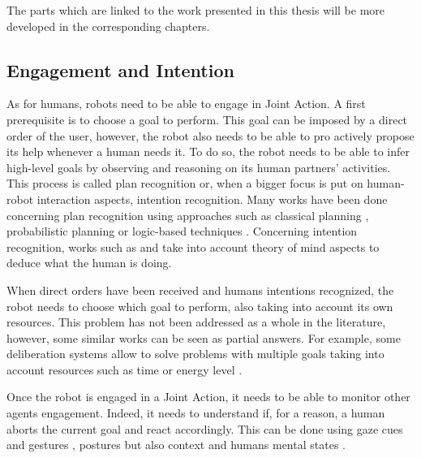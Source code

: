 \documentclass[english,a4paper,11pt,twoside]{StyleThese}
\begin{document}
The parts which are linked to the work presented in this thesis will be more developed in the corresponding chapters.

\subsection{Engagement and Intention}

\label{subsec:engagement}

As for humans, robots need to be able to engage in Joint Action. A first prerequisite is to choose a goal to perform. This goal can be imposed by a direct order of the user, however, the robot also needs to be able to pro actively propose its help whenever a human needs it. To do so, the robot needs to be able to infer high-level goals by observing and reasoning on its human partners’ activities. This process is called plan recognition or, when a bigger focus is put on human-robot interaction aspects, intention recognition. Many works have been done concerning plan recognition using approaches such as classical planning \cite{ramirez2009plan}, probabilistic planning \cite{bui2003general} or logic-based techniques \cite{singla2011abductive}. Concerning intention recognition, works such as \cite{breazeal2009embodied} and \cite{baker2014modeling} take into account theory of mind aspects to deduce what the human is doing.

When direct orders have been received and humans intentions recognized, the robot needs to choose which goal to perform, also taking into account its own resources. This problem has not been addressed as a whole in the literature, however, some similar works can be seen as partial answers. For example, some deliberation systems allow to solve problems with multiple goals taking into account resources such as time \cite{georgeff1987reactive, ghallab1994representation, lemai2004interleaving} or energy level \cite{rabideau1999iterative}.

Once the robot is engaged in a Joint Action, it needs to be able to monitor other agents engagement. Indeed, it needs to understand if, for a reason, a human aborts the current goal and react accordingly. This can be done using gaze cues and gestures \cite{rich2010recognizing}, postures \cite{sanghvi2011automatic} but also context and humans mental states \cite{salam2015multi}.
\end{document}
